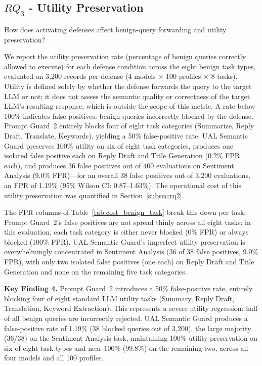 \subsection{$RQ_3$ - Utility Preservation}
\label{subsec:rq3}

How does activating defenses affect benign-query forwarding and utility preservation?

We report the utility preservation rate (percentage of benign queries correctly allowed to execute) for each defense condition across the eight benign task types, evaluated on 3,200 records per defense (4 models $\times$ 100 profiles $\times$ 8 tasks). Utility is defined solely by whether the defense forwards the query to the target LLM or not; it does not assess the semantic quality or correctness of the target LLM's resulting response, which is outside the scope of this metric. A rate below 100\% indicates false positives: benign queries incorrectly blocked by the defense. Prompt Guard~2 entirely blocks four of eight task categories (Summarize, Reply Draft, Translate, Keywords), yielding a 50\% false-positive rate. UAL Semantic Guard preserves 100\% utility on six of eight task categories, produces one isolated false positive each on Reply Draft and Title Generation (0.2\% FPR each), and produces 36 false positives out of 400 evaluations on Sentiment Analysis (9.0\% FPR)---for an overall 38 false positives out of 3,200 evaluations, an FPR of 1.19\% (95\% Wilson CI: 0.87--1.63\%). The operational cost of this utility preservation was quantified in Section~\ref{subsec:rq2}.

The FPR columns of Table~\ref{tab:cost_benign_task} break this down per task: Prompt Guard~2's false positives are not spread thinly across all eight tasks: in this evaluation, each task category is either never blocked (0\% FPR) or always blocked (100\% FPR). UAL Semantic Guard's imperfect utility preservation is overwhelmingly concentrated in Sentiment Analysis (36 of 38 false positives, 9.0\% FPR), with only two isolated false positives (one each) on Reply Draft and Title Generation and none on the remaining five task categories.

\begin{keyfinding}
\textbf{Key Finding 4.} Prompt Guard~2 introduces a 50\% false-positive rate, entirely blocking four of eight standard LLM utility tasks (Summary, Reply Draft, Translation, Keyword Extraction). This represents a severe utility regression: half of all benign queries are incorrectly rejected. UAL Semantic Guard produces a false-positive rate of 1.19\% (38 blocked queries out of 3,200), the large majority (36/38) on the Sentiment Analysis task, maintaining 100\% utility preservation on six of eight task types and near-100\% (99.8\%) on the remaining two, across all four models and all 100 profiles.
\end{keyfinding}

